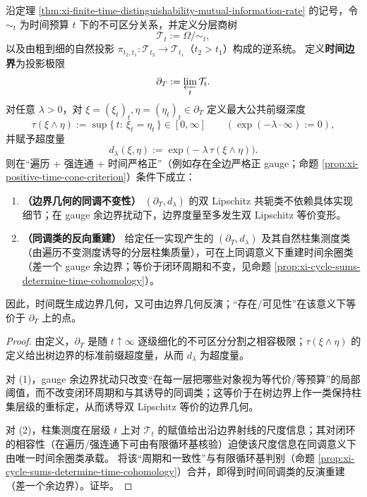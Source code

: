 \begin{theorem}\label{thm:xi-time-boundary-double-reconstruction}
沿定理 \ref{thm:xi-finite-time-distinguishability-mutual-information-rate} 的记号，令 \(\sim_t\) 为时间预算 \(t\) 下的不可区分关系，并定义分层商树
\[
\mathcal T_t:=\Omega/\!\sim_t,
\]
以及由粗到细的自然投影 \(\pi_{t_2,t_1}:\mathcal T_{t_2}\to \mathcal T_{t_1}\)（\(t_2>t_1\)）构成的逆系统。
定义\textbf{时间边界}为投影极限
\[
\partial_T:=\varprojlim_{t}\mathcal T_t.
\]
对任意 \(\lambda>0\)，对 \(\xi=(\xi_t)_t,\eta=(\eta_t)_t\in\partial_T\) 定义最大公共前缀深度
\[
\tau(\xi\wedge\eta):=\sup\{\,t:\ \xi_t=\eta_t\,\}\in[0,\infty]\qquad(\exp(-\lambda\cdot\infty):=0),
\]
并赋予超度量
\[
d_\lambda(\xi,\eta):=\exp\bigl(-\lambda\,\tau(\xi\wedge\eta)\bigr).
\]
则在“遍历 + 强连通 + 时间严格正”（例如存在全边严格正 gauge；命题 \ref{prop:xi-positive-time-cone-criterion}）条件下成立：
\begin{enumerate}
  \item \textbf{（边界几何的同调不变性）} \((\partial_T,d_\lambda)\) 的双 Lipschitz 共轭类不依赖具体实现细节；在 gauge 余边界扰动下，边界度量至多发生双 Lipschitz 等价变形。
  \item \textbf{（同调类的反向重建）} 给定任一实现产生的 \((\partial_T,d_\lambda)\) 及其自然柱集测度类（由遍历不变测度诱导的分层柱集质量），可在上同调意义下重建时间余圈类（差一个 gauge 余边界；等价于闭环周期和不变，见命题 \ref{prop:xi-cycle-sums-determine-time-cohomology}）。
\end{enumerate}
因此，时间既生成边界几何，又可由边界几何反演；“存在/可见性”在该意义下等价于 \(\partial_T\) 上的点。
\end{theorem}
\begin{proof}
由定义，\(\partial_T\) 是随 \(t\uparrow\infty\) 逐级细化的不可区分分割之相容极限；\(\tau(\xi\wedge\eta)\) 的定义给出树边界的标准前缀超度量，从而 \(d_\lambda\) 为超度量。
\par
对 (1)，gauge 余边界扰动只改变“在每一层把哪些对象视为等代价/等预算”的局部阈值，而不改变闭环周期和与其诱导的同调类；这等价于在树边界上作一类保持柱集层级的重标定，从而诱导双 Lipschitz 等价的边界几何。
\par
对 (2)，柱集测度在层级 \(t\) 上对 \(\mathcal T_t\) 的赋值给出沿边界射线的尺度信息；其对闭环的相容性（在遍历/强连通下可由有限循环基核验）迫使该尺度信息在同调意义下由唯一时间余圈类承载。
将该“周期和一致性”与有限循环基判别（命题 \ref{prop:xi-cycle-sums-determine-time-cohomology}）合并，即得到时间同调类的反演重建（差一个余边界）。证毕。
\end{proof}

